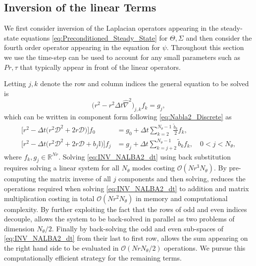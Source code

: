 \documentclass[a4paper]{article}
\newcommand{\Pran}{Pr}
\begin{document}
\subsection{Inversion of the linear Terms}

We first consider inversion of the Laplacian operators appearing in the steady-state equations \eqref{eq:Preconditioned_Steady_State} for $\Theta, \Sigma$ and then consider the fourth order operator appearing in the equation for $\psi$. Throughout this section we use the time-step can be used to account for any small parameters such as $\Pran,\tau$ that typically appear in front of the linear operators. 

Letting $j,k$ denote the row and column indices the general equation to be solved is
\begin{equation}
\big( r^2 - r^2 \Delta t  \hat{\nabla}^2 \big)_{j,k} f_k = g_j,
\end{equation}
which can be written in component form following \eqref{eq:Nabla2_Discrete} as
\begin{equation}
\begin{aligned} 
\bigg[ r^2 - \Delta t \big( r^2 \mathcal{D}^2 + 2 r \mathcal{D}                  \big) \bigg] f_0  &=  g_0 + \Delta t \sum_{k = 2}^{N_{\theta}-1} \frac{\tilde{b}_k}{2} f_k, \\
\bigg[  r^2 - \Delta t \big( r^2 \mathcal{D}^2 + 2 r \mathcal{D} + b_j \mathbb{I}  \big) \bigg] f_j  &=  g_j + \Delta t \sum_{k = j + 2}^{N_{\theta}-1} \tilde{b}_k f_k, \quad 0 < j < N_{\theta},
\end{aligned}
\label{eq:INV_NALBA2_dt}
\end{equation}
where $f_k,g_j \in \mathbb{R}^{Nr}$. Solving \eqref{eq:INV_NALBA2_dt} using back substitution requires solving a linear system for all $N_{\theta}$ modes costing $\mathcal{O}( Nr^3 N_{\theta} )$. By pre-computing the matrix inverse of all $j$ components and then solving, reduces the operations required when solving \eqref{eq:INV_NALBA2_dt} to addition and matrix multiplication costing in total $\mathcal{O}( Nr^2 N_{\theta} )$ in memory and computational complexity. By further exploiting the fact that the rows of odd and even indices decouple, allows the system to be back-solved in parallel as two problems of dimension $N_{\theta}/2$. Finally by back-solving the odd and even sub-spaces of \eqref{eq:INV_NALBA2_dt} from their last to first row, allows the sum appearing on the right hand side to be evaluated in $\mathcal{O}(Nr N_{\theta}/2)$ operations. We pursue this computationally efficient strategy for the remaining terms. 
\end{document}
